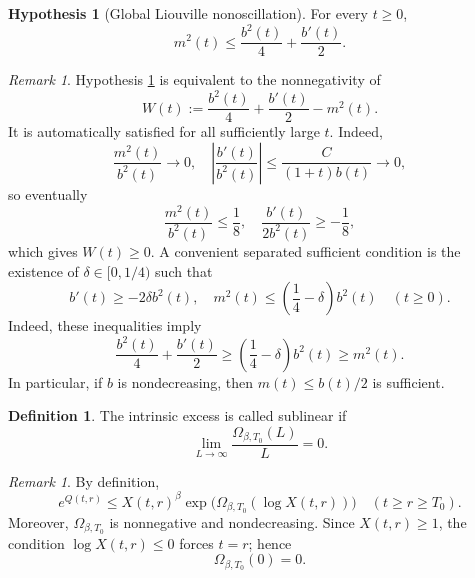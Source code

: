 \documentclass[11pt,reqno]{amsart}
\theoremstyle{definition}
\newtheorem{definition}[theorem]{Definition}
\newtheorem{hypothesis}[theorem]{Hypothesis}
\theoremstyle{remark}
\newtheorem{remark}[theorem]{Remark}
\begin{document}
	\begin{hypothesis}[Global Liouville nonoscillation]
		\label{ass:liouville}
		For every $t\geq0$,
		\begin{equation}
			\label{eq:liouville}
			m^2(t)\leq\frac{b^2(t)}4+\frac{b'(t)}2.
		\end{equation}
	\end{hypothesis}
	
	\begin{remark}
		Hypothesis \ref{ass:liouville} is equivalent to the nonnegativity of
		$$
		W(t):=\frac{b^2(t)}4+\frac{b'(t)}2-m^2(t).
		$$
		It is automatically satisfied for all sufficiently large $t$. Indeed,
		$$
		\frac{m^2(t)}{b^2(t)}\longrightarrow0,
		\quad
		\left|\frac{b'(t)}{b^2(t)}\right|
		\leq\frac{C}{(1+t)b(t)}\longrightarrow0,
		$$
		so eventually
		$$
		\frac{m^2(t)}{b^2(t)}\leq\frac18,
		\quad
		\frac{b'(t)}{2b^2(t)}\geq-\frac18,
		$$
		which gives $W(t)\geq0$. A convenient separated sufficient condition is the existence of $\delta\in[0,1/4)$ such that
		$$
		b'(t)\geq-2\delta b^2(t),
		\quad
		m^2(t)\leq\left(\frac14-\delta\right)b^2(t)
		\quad(t\geq0).
		$$
		Indeed, these inequalities imply
		$$
		\frac{b^2(t)}4+\frac{b'(t)}2
		\geq\left(\frac14-\delta\right)b^2(t)\geq m^2(t).
		$$
		In particular, if $b$ is nondecreasing, then $m(t)\leq b(t)/2$ is sufficient.
	\end{remark}
	
	\begin{definition}
		\label{def:sublinear}
		The intrinsic excess is called sublinear if
		$$
		\lim_{L\to\infty}\frac{\Omega_{\beta,T_0}(L)}{L}=0.
		$$
	\end{definition}
	
	\begin{remark}
		By definition,
		\begin{equation}
			\label{eq:balance-exp}
			e^{Q(t,r)}
			\leq X(t,r)^\beta
			\exp\bigl(\Omega_{\beta,T_0}(\log X(t,r))\bigr)
			\quad(t\geq r\geq T_0).
		\end{equation}
		Moreover, $\Omega_{\beta,T_0}$ is nonnegative and nondecreasing. Since $X(t,r)\geq1$, the condition $\log X(t,r)\leq0$ forces $t=r$; hence
		$$
		\Omega_{\beta,T_0}(0)=0.
		$$
	\end{remark}
	
\end{document}
